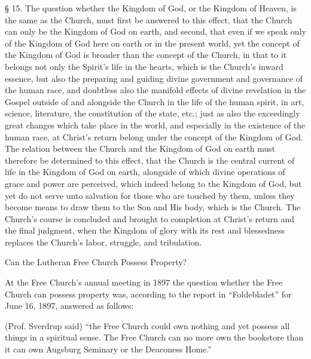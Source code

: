 § 15. The question whether the Kingdom of God, or the Kingdom of Heaven, is the same as the Church, must first be answered to this effect, that the Church can only be the Kingdom of God on earth, and second, that even if we speak only of the Kingdom of God here on earth or in the present world, yet the concept of the Kingdom of God is broader than the concept of the Church, in that to it belongs not only the Spirit’s life in the hearts, which is the Church’s inward essence, but also the preparing and guiding divine government and governance of the human race, and doubtless also the manifold effects of divine revelation in the Gospel outside of and alongside the Church in the life of the human spirit, in art, science, literature, the constitution of the state, etc.; just as also the exceedingly great changes which take place in the world, and especially in the existence of the human race, at Christ’s return belong under the concept of the Kingdom of God. The relation between the Church and the Kingdom of God on earth must therefore be determined to this effect, that the Church is the central current of life in the Kingdom of God on earth, alongside of which divine operations of grace and power are perceived, which indeed belong to the Kingdom of God, but yet do not serve unto salvation for those who are touched by them, unless they become means to draw them to the Son and His body, which is the Church. The Church’s course is concluded and brought to completion at Christ’s return and the final judgment, when the Kingdom of glory with its rest and blessedness replaces the Church’s labor, struggle, and tribulation.

Can the Lutheran Free Church Possess Property?

At the Free Church’s annual meeting in 1897 the question whether the Free Church can possess property was, according to the report in “Foldebladet” for June 16, 1897, answered as follows:

(Prof. Sverdrup said) “the Free Church could own nothing and yet possess all things in a spiritual sense. The Free Church can no more own the bookstore than it can own Augsburg Seminary or the Deaconess Home.”
